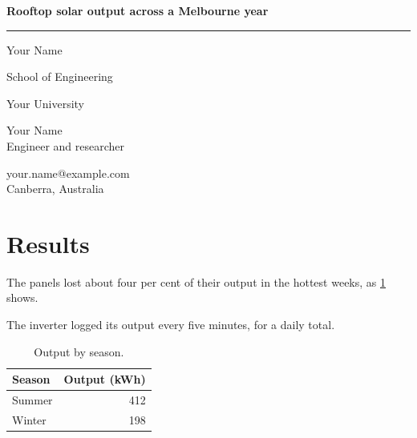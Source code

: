 \documentclass[11pt,a4paper]{article}
\begin{document}
\begin{titlepage}
  \centering
  \vspace*{30mm}
  {\LARGE\bfseries Rooftop solar output across a Melbourne year\par}
  \vspace{12mm}
  \rule{0.6\linewidth}{0.4pt}\par
  {\Large Your Name\par}
  \vfill
  School of Engineering\par
  Your University
\end{titlepage}

\begin{minipage}[t]{0.6\linewidth}
  Your Name\\
  Engineer and researcher
\end{minipage}\hfill
\begin{minipage}[t]{0.38\linewidth}\raggedleft
  your.name@example.com\\
  Canberra, Australia
\end{minipage}

\section{Results}\label{sec:results}

\begin{tcolorbox}
The panels lost about four per cent of their output in the hottest weeks, as \cref{tab:output} shows.
\end{tcolorbox}

The inverter logged its output every five minutes,  for a daily total.

\begin{table}[ht]
  \centering
  \caption{Output by season.}
  \label{tab:output}
  \begin{tabular}{|l|r|}
    \hline
    Season & Output (kWh) \\
    \hline
    Summer & 412 \\
    Winter & 198 \\
    \hline
  \end{tabular}
\end{table}
\end{document}

